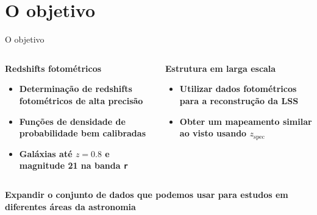 \section{O objetivo}
\begin{frame}[c]{O objetivo}
    \begin{columns}[c]
        \begin{column}{0.46\linewidth}
            \begin{splusbox}{\textbf{Redshifts fotométricos}}
                \begin{itemize}
                    \justifying
                    \item \textbf{Determinação de redshifts fotométricos de alta precisão}
                    \item \textbf{Funções de densidade de probabilidade bem calibradas}
                    \item \textbf{Galáxias até $z=0.8$ e magnitude 21 na banda \texttt{r}}
                \end{itemize}
            \end{splusbox}
        \end{column}
        \begin{column}{0.46\linewidth}
            \begin{splusbox}{\textbf{Estrutura em larga escala}}
                \begin{itemize}
                    \justifying
                    \item \textbf{Utilizar dados fotométricos para a reconstrução da LSS}
                    \item \textbf{Obter um mapeamento similar ao visto usando $z_\text{spec}$}
                \end{itemize}
            \end{splusbox}
        \end{column}
    \end{columns}

    \centering
    \begin{splusbox}{}
        \textbf{Expandir o conjunto de dados que podemos usar para estudos em diferentes áreas da astronomia}
    \end{splusbox}
\end{frame}

